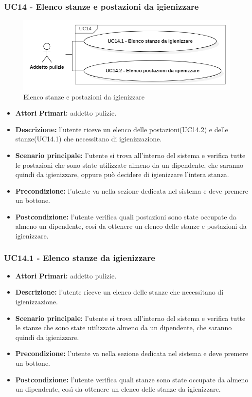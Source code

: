 \subsubsection{ UC14 - Elenco stanze e postazioni da igienizzare}
\begin{figure}[H]
		\centering
		\includegraphics[width=15cm]{res/images/UC14.png}
		\caption{Elenco stanze e postazioni da igienizzare}
		\label{fig:Elenco stanze e postazioni da igienizzare}
	\end{figure}
\begin{itemize}
           	\item\textbf{Attori Primari:} addetto pulizie.
           	\item\textbf{Descrizione:} l'utente riceve un elenco delle postazioni(UC14.2) e delle stanze(UC14.1) che necessitano di igienizzazione.
           	\item\textbf{Scenario principale:} l'utente si trova all'interno del sistema e verifica tutte le postazioni che sono state utilizzate almeno da un dipendente, che saranno quindi da igienizzare, oppure può decidere di igienizzare l’intera stanza.
           	\item\textbf{Precondizione:} l'utente va nella sezione dedicata nel sistema e deve premere un bottone.
           	\item\textbf{Postcondizione:} l'utente verifica quali postazioni sono state occupate da almeno un dipendente, così da ottenere un elenco delle stanze e postazioni da igienizzare.
\end{itemize}

\subsubsection{UC14.1 - Elenco stanze da igienizzare}
\begin{itemize}
           	\item\textbf{Attori Primari:} addetto pulizie.
           	\item\textbf{Descrizione:} l'utente riceve un elenco delle stanze che necessitano di igienizzazione.
           	\item\textbf{Scenario principale:} l'utente si trova all'interno del sistema e verifica tutte le stanze che sono state utilizzate almeno da un dipendente, che saranno quindi da igienizzare.
           	\item\textbf{Precondizione:} l'utente va nella sezione dedicata nel sistema e deve premere un bottone.
           	\item\textbf{Postcondizione:} l'utente verifica quali stanze sono state occupate da almeno un dipendente, così da ottenere un elenco delle stanze da igienizzare.
\end{itemize}
